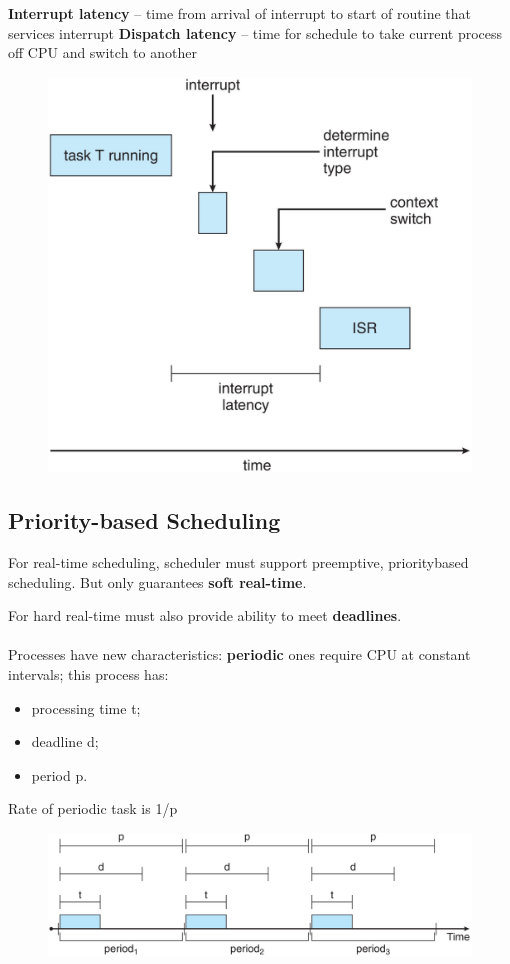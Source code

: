 \textbf{Interrupt latency} – time from arrival of interrupt to start of routine that services interrupt
\textbf{Dispatch latency }– time for schedule to take current process off CPU and switch to another


\begin{figure}[htbp]
    \centering
    \includegraphics[width=0.45\linewidth]{img/latency.png}
    
    
\end{figure}


\subsection{Priority-based Scheduling}

For real-time scheduling, scheduler must support preemptive, prioritybased scheduling. But only guarantees \textbf{soft real-time}.

For hard real-time must also provide ability to meet \textbf{deadlines}.
\paragraph{}
Processes have new characteristics: \textbf{periodic} ones require CPU at constant intervals; this process has:

\begin{itemize}
    \item processing time t;
    \item deadline d;
    \item period p.
\end{itemize}

Rate of periodic task is 1/p


\begin{figure}[htbp]
    \centering
    \includegraphics[width=0.75\linewidth]{img/priority_base.png}   
    
\end{figure}

